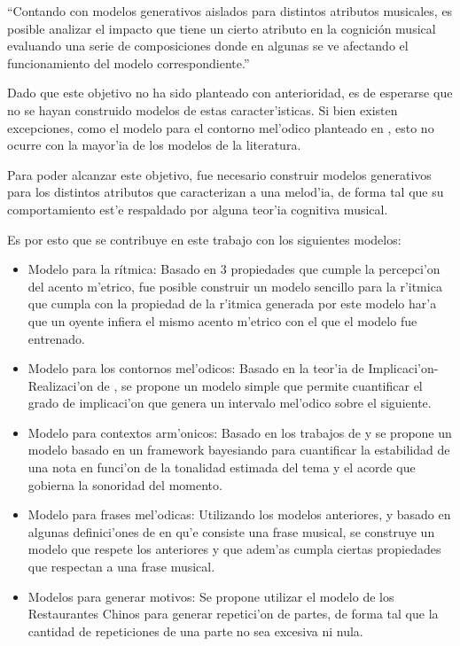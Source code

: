 ``Contando con modelos generativos aislados para distintos atributos musicales, es posible analizar el impacto que tiene un cierto atributo en la cognici\'on musical
evaluando una serie de composiciones donde en algunas se ve afectando el funcionamiento del modelo correspondiente.''


Dado que este objetivo no ha sido planteado con anterioridad, es de esperarse que no se hayan construido modelos de estas caracter'isticas. Si bien existen excepciones, 
como el modelo para el contorno mel'odico planteado en \cite{PaieThesis}, esto no ocurre con la mayor'ia de los modelos de la literatura. 

Para poder alcanzar este objetivo, fue necesario construir modelos generativos para los distintos atributos que caracterizan a una melod'ia, de forma tal que
su comportamiento est'e respaldado por alguna teor'ia cognitiva musical. 


Es por esto que se contribuye en este trabajo con los siguientes modelos:
\begin{itemize}
 \item Modelo para la r\'itmica: Basado en 3 propiedades que cumple la percepci'on del acento m'etrico, fue posible construir un modelo sencillo para la r'itmica
 que cumpla con la propiedad de la r'itmica generada por este modelo har'a que un oyente infiera el mismo acento m'etrico con el que el modelo fue entrenado.
 \item Modelo para los contornos mel'odicos: Basado en la teor'ia de Implicaci'on-Realizaci'on de \cite{Narmour91}, se propone un modelo simple que permite cuantificar el grado 
 de implicaci'on que genera un intervalo mel'odico sobre el siguiente.
 \item Modelo para contextos arm'onicos: Basado en los trabajos de \cite{Krumhansl90} y \cite{Lerdahl2001} se propone un modelo basado en un framework bayesiando
 para cuantificar la estabilidad de una nota en funci'on de la tonalidad estimada del tema y el acorde que gobierna la sonoridad del momento.
 \item Modelo para frases mel'odicas: Utilizando los modelos anteriores, y basado en algunas definici'ones de en qu'e consiste una frase musical, se construye un modelo
 que respete los anteriores y que adem'as cumpla ciertas propiedades que respectan a una frase musical.
 \item Modelos para generar motivos: Se propone utilizar el modelo de los Restaurantes Chinos para generar repetici'on de partes, 
 de forma tal que la cantidad de repeticiones de una parte no sea excesiva ni nula.
\end{itemize}
